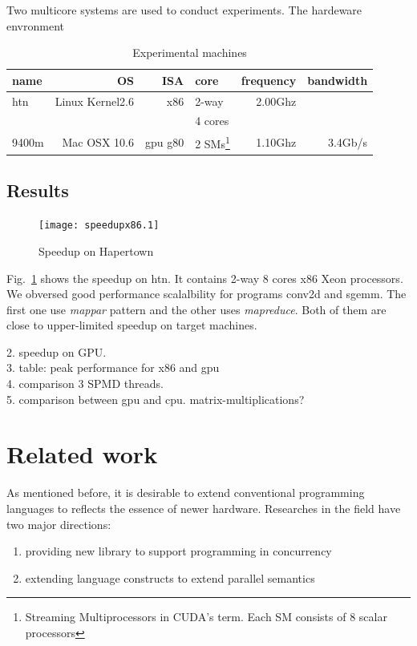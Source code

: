 \documentclass[10pt, conference, compsocconf]{IEEEtran}
\begin{document}
Two multicore systems are used to conduct experiments. The hardeware
envronment 
\begin{table}[hb]
\caption{Experimental machines}
\begin{center}
\begin{tabular}{|l|r|r|l|r|r|}
\hline
\textbf{name}&\textbf{OS}&\textbf{ISA}  & \textbf{core}   & \textbf{frequency}  & \textbf{bandwidth}\\
\hline 
htn &\small{Linux Kernel2.6}& x86 & 2-way & 2.00Ghz  & \\
    &    &&4 cores&       & \\           
\hline
9400m&\small{Mac OSX 10.6}& gpu g80  & 2 SMs\footnote{Streaming Multiprocessors in CUDA's
  term. Each SM consists of 8 scalar processors}& 1.10Ghz  &
3.4Gb/s \\
\hline
\end{tabular} 
\end{center}
\end{table}
\subsection{Results}

\begin{figure}
\texttt{[image: speedupx86.1]}
\caption{Speedup on Hapertown}\label{fig:spdx86}
\end{figure}

Fig.~\ref{fig:spdx86} shows the speedup on htn. It contains 2-way 8 cores x86 Xeon
processors. We obversed good performance scalalbility for programs
conv2d and sgemm. The first one use \emph{mappar} pattern and the
other uses \emph{mapreduce}.  Both of them are close to upper-limited
speedup on target machines. 

2. speedup on GPU.\\
3. table: peak performance for x86 and gpu\\
4. comparison 3 SPMD threads.\\
5. comparison between gpu and cpu. matrix-multiplications?

\section{Related work}
As mentioned before, it is desirable to extend conventional programming languages to reflects the essence of newer hardware. Researches in the field have two major directions:
\begin{enumerate}
\item providing new library to support programming in concurrency
\item extending language constructs to extend parallel semantics
\end{enumerate}
\end{document}
